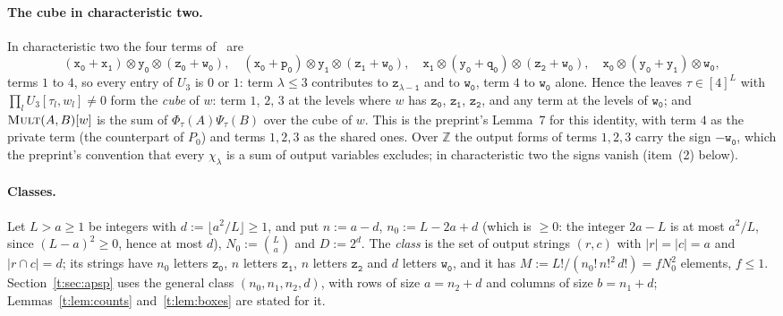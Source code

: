 \documentclass[11pt]{article}
\theoremstyle{definition}
\theoremstyle{remark}
\newcommand{\Z}{\mathbb{Z}}
\newcommand{\Mult}{\textnormal{\textsc{Mult}}}
\newcommand{\Nz}{N_0}
\newcommand{\tl}[1]{\mathtt{#1}}
\begin{document}
\paragraph{The cube in characteristic two.} In characteristic two the four terms of~\cite[Lemma~2.1]{Maj26b} are
\[
(\tl{x_0}+\tl{x_1})\otimes\tl{y_0}\otimes(\tl{z_0}+\tl{w_0}),\quad
(\tl{x_0}+\tl{p_0})\otimes\tl{y_1}\otimes(\tl{z_1}+\tl{w_0}),\quad
\tl{x_1}\otimes(\tl{y_0}+\tl{q_0})\otimes(\tl{z_2}+\tl{w_0}),\quad
\tl{x_0}\otimes(\tl{y_0}+\tl{y_1})\otimes\tl{w_0},
\]
terms $1$ to $4$, so every entry of $U_3$ is $0$ or $1$: term $\lambda\le3$ contributes to $\tl{z_{\lambda-1}}$ and to $\tl{w_0}$, term $4$ to $\tl{w_0}$ alone. Hence the leaves $\tau\in[4]^L$ with $\prod_lU_3[\tau_l,w_l]\ne0$ form the \emph{cube} of $w$: term $1$, $2$, $3$ at the levels where $w$ has $\tl{z_0}$, $\tl{z_1}$, $\tl{z_2}$, and any term at the levels of $\tl{w_0}$; and $\Mult(A,B)[w]$ is the sum of $\Phi_\tau(A)\Psi_\tau(B)$ over the cube of $w$. This is the preprint's Lemma~7 for this identity, with term $4$ as the private term (the counterpart of $P_0$) and terms $1,2,3$ as the shared ones. Over $\Z$ the output forms of terms $1,2,3$ carry the sign $-\tl{w_0}$, which the preprint's convention that every $\chi_\lambda$ is a sum of output variables excludes; in characteristic two the signs vanish (item~(2) below).

\paragraph{Classes.} Let $L>a\ge1$ be integers with $d:=\lfloor a^2/L\rfloor\ge1$, and put $n:=a-d$, $n_0:=L-2a+d$ (which is $\ge0$: the integer $2a-L$ is at most $a^2/L$, since $(L-a)^2\ge0$, hence at most $d$), $\Nz:=\binom La$ and $D:=2^d$. The \emph{class} is the set of output strings $(r,c)$ with $|r|=|c|=a$ and $|r\cap c|=d$; its strings have $n_0$ letters $\tl{z_0}$, $n$ letters $\tl{z_1}$, $n$ letters $\tl{z_2}$ and $d$ letters $\tl{w_0}$, and it has $M:=L!/(n_0!\,n!^2\,d!)=f\Nz^2$ elements, $f\le1$. Section~\ref{t:sec:apsp} uses the general class $(n_0,n_1,n_2,d)$, with rows of size $a=n_2+d$ and columns of size $b=n_1+d$; Lemmas~\ref{t:lem:counts} and~\ref{t:lem:boxes} are stated for it.
\end{document}
